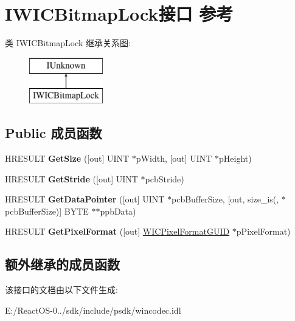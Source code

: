 \hypertarget{interface_i_w_i_c_bitmap_lock}{}\section{I\+W\+I\+C\+Bitmap\+Lock接口 参考}
\label{interface_i_w_i_c_bitmap_lock}
类 I\+W\+I\+C\+Bitmap\+Lock 继承关系图\+:\begin{figure}[H]
\begin{center}
\leavevmode
\includegraphics[height=2.000000cm]{interface_i_w_i_c_bitmap_lock}
\end{center}
\end{figure}
\subsection*{Public 成员函数}
\begin{DoxyCompactItemize}
\item 
\mbox{\label{interface_i_w_i_c_bitmap_lock_af4a2c1bd57ae6ed775d3cfa8aadf941a}} 
H\+R\+E\+S\+U\+LT {\bfseries Get\+Size} (\mbox{[}out\mbox{]} U\+I\+NT $\ast$p\+Width, \mbox{[}out\mbox{]} U\+I\+NT $\ast$p\+Height)
\item 
\mbox{\label{interface_i_w_i_c_bitmap_lock_ab28550273e27ce9c9ea48daa33c37c89}} 
H\+R\+E\+S\+U\+LT {\bfseries Get\+Stride} (\mbox{[}out\mbox{]} U\+I\+NT $\ast$pcb\+Stride)
\item 
\mbox{\label{interface_i_w_i_c_bitmap_lock_a0fc043d8eec115977f40d05a6dd515fa}} 
H\+R\+E\+S\+U\+LT {\bfseries Get\+Data\+Pointer} (\mbox{[}out\mbox{]} U\+I\+NT $\ast$pcb\+Buffer\+Size, \mbox{[}out, size\+\_\+is(, $\ast$pcb\+Buffer\+Size)\mbox{]} B\+Y\+TE $\ast$$\ast$ppb\+Data)
\item 
\mbox{\label{interface_i_w_i_c_bitmap_lock_a7bdde8c97d4fd7576e57c11ae43a0135}} 
H\+R\+E\+S\+U\+LT {\bfseries Get\+Pixel\+Format} (\mbox{[}out\mbox{]} \hyperlink{interface_g_u_i_d}{W\+I\+C\+Pixel\+Format\+G\+U\+ID} $\ast$p\+Pixel\+Format)
\end{DoxyCompactItemize}
\subsection*{额外继承的成员函数}


该接口的文档由以下文件生成\+:\begin{DoxyCompactItemize}
\item 
E\+:/\+React\+O\+S-\/0../sdk/include/psdk/wincodec.\+idl\end{DoxyCompactItemize}
